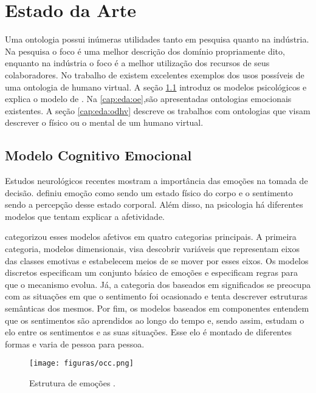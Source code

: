 \chapter{Estado da Arte} \label{cap:eda}

Uma ontologia possui inúmeras utilidades tanto em pesquisa quanto na
indústria. Na pesquisa o foco é uma melhor descrição dos domínio propriamente
dito, enquanto na indústria o foco é a melhor utilização dos recursos de seus
colaboradores. No trabalho de \citet{Gutierrez:2007:OVH:1229160.1229164} existem
excelentes exemplos dos usos possíveis de uma ontologia de humano virtual.
A seção \ref{cap:eda:mce} introduz os modelos psicológicos e explica o modelo de
\citet{ortony1988cse}. Na \ref{cap:eda:oe},são apresentadas ontologias emocionais
existentes. A seção \ref{cap:eda:odhv} descreve os trabalhos com ontologias que visam
descrever o físico ou o mental de um humano virtual.

\section{Modelo Cognitivo Emocional} \label{cap:eda:mce}

Estudos neurológicos recentes \cite{ledoux1998emotional,damasio2004erro}
mostram a importância das emoções na tomada de decisão.
\citet{damasio2004erro} definiu emoção como sendo um estado físico do corpo e
o sentimento sendo a percepção desse estado corporal. Além disso, na psicologia
há diferentes modelos que tentam explicar a afetividade.

\citet{scherer2000tnoe} categorizou esses modelos afetivos em quatro
categorias principais. A primeira categoria, modelos dimensionais, visa
descobrir variáveis que representam eixos das classes emotivas e estabelecem
meios de se mover por esses eixos. Os modelos discretos especificam um
conjunto básico de emoções e especificam regras para que o mecanismo evolua.
Já, a categoria dos baseados em significados se preocupa com as situações
em que o sentimento foi ocasionado e tenta descrever estruturas semânticas dos
mesmos. Por fim, os modelos baseados em componentes entendem que os
sentimentos são aprendidos ao longo do tempo e, sendo assim, estudam o elo
entre os sentimentos e as suas situações. Esse elo é montado de diferentes
formas e varia de pessoa para pessoa.

\begin{figure}[t]
  \centering
    \texttt{[image: figuras/occ.png]}
  \caption{Estrutura de emoções \cite{ortony1988cse}.}
  \label{fig:occ_model}
\end{figure}

